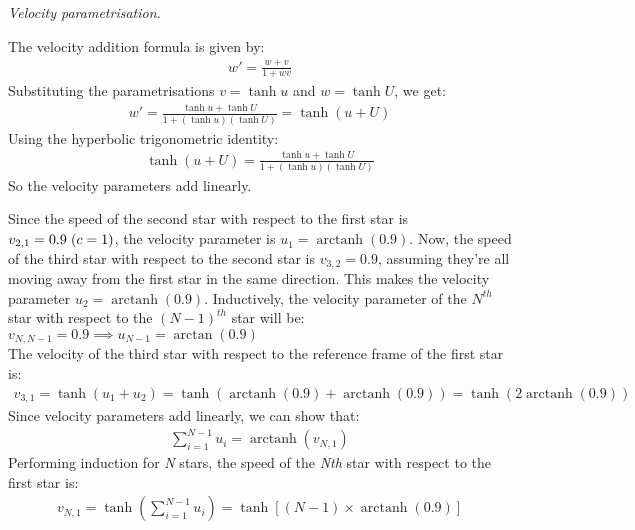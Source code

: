 \documentclass{report}
\DeclareMathOperator{\arctanh}{arctanh}
\begin{document}
\begin{subquests}
\begin{subquests}
		\item

		\item

		\item

		\item

		\item
	\end{subquests}

	\item \emph{Velocity parametrisation.}
	\begin{subquests}
		\item
		The velocity addition formula is given by:
		\begin{gather*}
			w' = \frac{w+v}{1+wv}
		\end{gather*}
		Substituting the parametrisations $v = \tanh u$ and $w = \tanh U$, we get:
		\begin{gather*}
			w' = \frac{\tanh u + \tanh U}{1+(\tanh u)(\tanh U)} = \tanh(u+U)
		\end{gather*}
		Using the hyperbolic trigonometric identity:
		\begin{gather*}
			\tanh(u+U) = \frac{\tanh u + \tanh U}{1+(\tanh u)(\tanh U)}
		\end{gather*}	
		So the velocity parameters add linearly.

		\item
		Since the speed of the second star with respect to the first star is $v_{2,1} = 0.9 \hspace{3 pt}(c = 1)$, the velocity parameter is $u_{1} = \arctanh(0.9)$. Now, the speed of the third star with respect to the second star is $v_{3,2} = 0.9$, assuming they're all moving away from the first star in the same direction. This makes the velocity parameter $u_{2} = \arctanh(0.9)$. Inductively, the velocity parameter of the $N^{th}$ star with respect to the $(N-1)^{th}$ star will be: $v_{N,N-1} = 0.9 \implies u_{N-1} = \arctan(0.9)$ \\ 
		The velocity of the third star with respect to the reference frame of the first star is:
		\begin{gather*}
		 	v_{3,1} = \tanh(u_{1}+u_{2}) = \tanh(\arctanh(0.9)+\arctanh(0.9)) = \tanh(2\arctanh(0.9))
		\end{gather*}
		Since velocity parameters add linearly, we can show that:
		\begin{gather*}
			\sum_{i=1}^{N-1}u_{i} = \arctanh(v_{N,1})
		\end{gather*}
		Performing induction for {\em N} stars, the speed of the {\em Nth} star with respect to the first star is:
		\begin{gather*}
		 	v_{N,1} = \tanh\left(\sum_{i=1}^{N-1}u_{i}\right)= \tanh[(N-1)\times\arctanh(0.9)]
		\end{gather*}
	\end{subquests}


\end{subquests}
\end{document}
